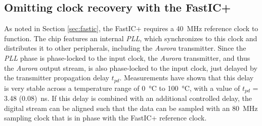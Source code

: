 \subsection{Omitting clock recovery with the FastIC+}
As noted in Section \ref{sec:fastic}, the FastIC+ requires a \SI{40}{\mega\hertz} reference clock to function. The chip features an internal \emph{PLL}, which synchronizes to this clock and distributes it to other peripherals, including the \emph{Aurora} transmitter. Since the \emph{PLL} phase is phase-locked to the input clock, the \emph{Aurora} transmitter, and thus the \emph{Aurora} output stream, is also phase-locked to the input clock, just delayed by the transmitter propagation delay $t_{pd}$. Measurements have shown that this delay is very stable across a temperature range of \SI{0}{\celsius} to \SI{100}{\celsius}, with a value of $t_{pd}$ = \SI{3.48 (0.08)}{\nano\second}. If this delay is combined with an additional controlled delay, the digital stream can be aligned such that the data can be sampled with an \SI{80}{\mega\hertz} sampling clock that is in phase with the FastIC+ reference clock.

